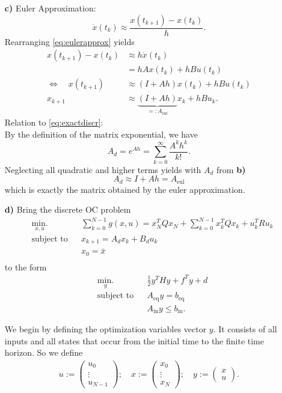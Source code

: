 \documentclass[]{article}
\newcommand{\ind}[2]{{#1}_{\mathrm{#2}}}
\newcommand{\trp}{^T}
\newcommand{\dotx}{\dot x}
\newcommand{\xnull}{x_0}
\newcommand{\unull}{u_0}
\newcommand{\xN}{x_N}
\newcommand{\xk}{x_k}
\newcommand{\uk}{u_k}
\newcommand{\Ad}{A_d}
\newcommand{\Bd}{B_d}
\newcommand{\xkplus}{x_{k+1}}
\newcommand{\tk}{t_{k}}
\newcommand{\tkplus}{t_{k+1}}
\newcommand{\Aeul}{\ind{A}{eul}}
\newcommand{\Aeq}{\ind{A}{eq}}
\newcommand{\beq}{\ind{b}{eq}}
\newcommand{\Aineq}{\ind{A}{{  in}}}
\newcommand{\bineq}{\ind{b}{{  in}}}
\newcommand{\xbar}{\bar{x}}
\newcommand{\vectorthree}[3]{\begin{pmatrix}
		#1 \\ #2 \\ #3
\end{pmatrix}}
\newcommand{\vectortwo}[2]{\begin{pmatrix}
		#1 \\ #2
\end{pmatrix}}
\newcommand{\half}{\frac{1}{2}}
\begin{document}
\begin{enumerate}
		\item[\bf c)] Euler Approximation: \begin{equation}
			\dotx(\tk) \approx \frac{x(\tkplus) - x(\tk)}{h}. \label{eq:eulerapprox} 
		\end{equation}
		Rearranging \eqref{eq:eulerapprox} yields 
		\begin{align}
			x(\tkplus) - x(\tk) &\approx h \dotx(\tk)\\
			&= hAx(\tk) + hBu(\tk)\\
			\Longleftrightarrow \quad x(\tkplus) &\approx (I+Ah)x(\tk) + hBu(\tk)\\
			 \xkplus &\approx \underbrace{(I+Ah)}_{=: \Aeul} \xk + hB\uk.
		\end{align}
		Relation to \eqref{eq:exactdiscr}:\\
		By the definition of the matrix exponential, we have
		\begin{equation}
			\Ad = e^{Ah} = \sum_{k=0}^{\infty} \frac{A^kh^k}{k!}.
		\end{equation}
		 Neglecting all quadratic and higher terms yields with $ \Ad $ from {\bf b)} \[ \Ad \approx I+Ah = \Aeul  \] which is exactly the matrix obtained by the euler approximation.
	\item[\bf d)]  Bring the discrete OC problem
	\begin{equation}
		\begin{aligned}
		& \underset{x,u}{\text{min.}}
		& & \sum_{k=0}^{N-1} g(x,u) =  \xN\trp Q \xN + \sum_{k = 0}^{N-1} \xk \trp Q \xk + \uk\trp R \uk\\
		& \text{subject to}
		& & \xkplus = \Ad \xk + \Bd \uk\\
		& & &\xnull = \xbar\\ 
		\end{aligned}
	\end{equation}
	to the form
	\begin{equation} \label{eq:quadproblem}
		\begin{aligned}
		& \underset{y}{\text{min.}}
		& & \half y\trp H y + f\trp y + d\\
		& \text{subject to}
		& & \Aeq y = \beq\\
		& & &\Aineq y\leq \bineq.
		\end{aligned}
	\end{equation}
	
	
	We begin by defining the optimization variables vector $ y $. It consists of all inputs and all states that occur from the initial time to the finite time horizon. So we define
	\begin{equation}
		\begin{gathered}
		u := \vectorthree{\unull}{\vdots}{u_{N-1}}; \quad  x := \vectorthree{\xnull}{\vdots}{\xN}; \quad y := \vectortwo{x}{u} .
		\end{gathered}
	\end{equation}
	 

\end{enumerate}
\end{document}
